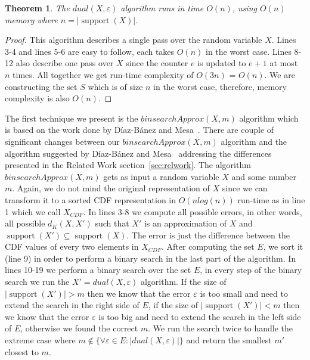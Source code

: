 \documentclass[letterpaper]{article} %
\newtheorem{theorem}[thm]{Theorem}
\DeclareMathOperator{\support}{support}
\begin{document}

\begin{theorem}\label{the:complexityDual}
	The $dual(X,\varepsilon)$ algorithm runs in time $O(n)$, using $O(n)$ memory where $n=|\support(X)|$.
\end{theorem}
\begin{proof}
	This algorithm describes a single pass over the random variable $X$. Lines 3-4 and lines 5-6 are easy to follow, each takes $O(n)$ in the worst case. Lines 8-12 also describe one pass over $X$ since the counter $e$ is updated to $e+1$ at most $n$ times. All together we get run-time complexity of $O(3n)$ = $O(n)$. We are constructing the set $S$ which is of size $n$ in the worst case, therefore, memory complexity is also $O(n)$. 
\end{proof}

The first technique we present is the $binsearchApprox(X,m)$ algorithm which is based on the work done by D{\'i}az-B{\'a}nez and Mesa~\cite{diaz2001fitting}. There are couple of significant changes between our $binsearchApprox(X,m)$ algorithm and the algorithm suggested by D{\'i}az-B{\'a}nez and Mesa~\cite{diaz2001fitting} addressing the differences presented in the Related Work section~\ref{sec:relwork}. The algorithm $binsearchApprox(X,m)$ gets as input a random variable $X$ and some number $m$. Again, we do not mind the original representation of $X$ since we can transform it to a sorted CDF representation in $O(nlog(n))$ run-time as in line 1 which we call $X_{CDF}$. In lines 3-8 we compute all possible errors, in other words, all possible $d_{K}(X,X')$ such that $X'$ is an approximation of $X$ and $\support(X') \subseteq \support(X)$. The error is just the difference between the CDF values of every two elements in $X_{CDF}$. After computing the set $E$, we sort it (line 9) in order to perform a binary search in the last part of the algorithm. In lines 10-19 we perform a binary search over the set $E$, in every step of the binary search we run the $X' = dual(X,\varepsilon)$ algorithm. If the size of $|\support(X')|>m$ then we know that the error $\varepsilon$ is too small and need to extend the search in the right side of $E$, if the size of $|\support(X')|<m$ then we know that the error $\varepsilon$ is too big and need to extend the search in the left side of $E$, otherwise we found the correct $m$. We run the search twice to handle the extreme case where $m \notin \{\forall \varepsilon\in E: |dual(X,\varepsilon)|\}$ and return the smallest $m'$ closest to $m$.
 
\end{document}

